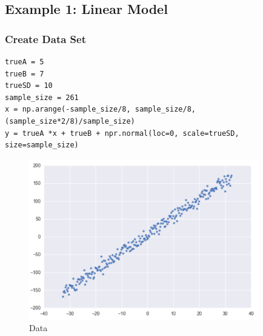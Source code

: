 \documentclass[a4paper,10.5pt,uplatex]{jsarticle}  %
\begin{document}
\subsection{Example 1: Linear Model}
\subsubsection{Create Data Set}
\begin{lstlisting}
trueA = 5
trueB = 7
trueSD = 10
sample_size = 261
x = np.arange(-sample_size/8, sample_size/8, (sample_size*2/8)/sample_size)
y = trueA *x + trueB + npr.normal(loc=0, scale=trueSD, size=sample_size)
\end{lstlisting}
\begin{figure}[H]
\centering
\includegraphics[width=10.0cm]{mh-data.pdf}
\caption{Data}
\end{figure}
\end{document}

